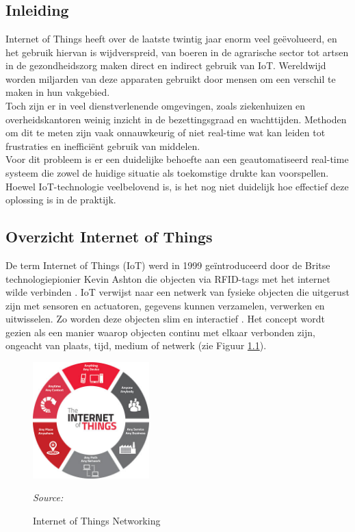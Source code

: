 

\chapter{}%
\label{ch:stand-van-zaken}

\section{Inleiding}
Internet of Things heeft over de laatste twintig jaar enorm veel geëvolueerd, en het gebruik hiervan is wijdverspreid, van boeren in de agrarische sector tot artsen in de gezondheidszorg maken direct en indirect gebruik van IoT. Wereldwijd worden miljarden van deze apparaten gebruikt door mensen om een verschil te maken in hun vakgebied. \\

Toch zijn er in veel dienstverlenende omgevingen, zoals ziekenhuizen en overheidskantoren weinig inzicht in de bezettingsgraad en wachttijden. Methoden om dit te meten zijn vaak onnauwkeurig of niet real-time wat kan leiden tot frustraties en inefficiënt gebruik van middelen. \\

Voor dit probleem is er een duidelijke behoefte aan een geautomatiseerd real-time systeem die zowel de huidige situatie als toekomstige drukte kan voorspellen. Hoewel IoT-technologie veelbelovend is, is het nog niet duidelijk hoe effectief deze oplossing is in de praktijk.

\section{Overzicht Internet of Things}
De term Internet of Things (IoT) werd in 1999 geïntroduceerd door de Britse technologiepionier Kevin Ashton die objecten via RFID-tags met het internet wilde verbinden \autocite{Bassi2013, Rejeb2023}. IoT verwijst naar een netwerk van fysieke objecten die uitgerust zijn met sensoren en actuatoren, gegevens kunnen verzamelen, verwerken en uitwisselen. Zo worden deze objecten slim en interactief \autocite{Elksasy2023}. Het concept wordt gezien als een manier waarop objecten continu met elkaar verbonden zijn, ongeacht van plaats, tijd, medium of netwerk (zie Figuur \ref{fig:Figuur8}).

\begin{figure}[h]
    \centering
    \includegraphics[width=0.4\textwidth]{img/bp/iot-concept.jpg}
    \caption{Internet of Things Networking}
    \label{fig:Figuur8}
    \textit{Source: \autocite{Dauwed2018}}
\end{figure}

